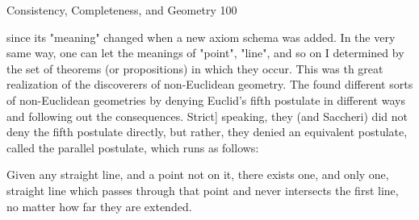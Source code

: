 Consistency, Completeness, and Geometry                                                        100

since its "meaning" changed when a new axiom schema was added. In the very same
way, one can let the meanings of "point", "line", and so on I determined by the set of
theorems (or propositions) in which they occur. This was th great realization of the
discoverers of non-Euclidean geometry. The found different sorts of non-Euclidean
geometries by denying Euclid's fifth postulate in different ways and following out the
consequences. Strict] speaking, they (and Saccheri) did not deny the fifth postulate
directly, but rather, they denied an equivalent postulate, called the parallel postulate,
which runs as follows:

   Given any straight line, and a point not on it, there exists one, and only one, straight
   line which passes through that point and never intersects the first line, no matter
   how far they are extended.

